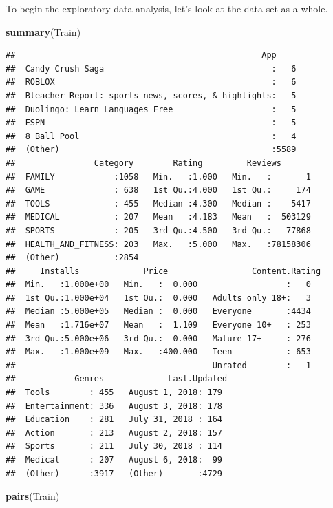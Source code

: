 \documentclass[]{article}
\newenvironment{Shaded}{\begin{snugshade}}{\end{snugshade}}
\newcommand{\KeywordTok}[1]{\textcolor[rgb]{0.13,0.29,0.53}{\textbf{#1}}}
\newcommand{\NormalTok}[1]{#1}
\begin{document}
To begin the exploratory data analysis, let's look at the data set as a
whole.

\begin{Shaded}
\begin{Highlighting}[]
\KeywordTok{summary}\NormalTok{(Train)}
\end{Highlighting}
\end{Shaded}

\begin{verbatim}
##                                                  App      
##  Candy Crush Saga                                  :   6  
##  ROBLOX                                            :   6  
##  Bleacher Report: sports news, scores, & highlights:   5  
##  Duolingo: Learn Languages Free                    :   5  
##  ESPN                                              :   5  
##  8 Ball Pool                                       :   4  
##  (Other)                                           :5589  
##                Category        Rating         Reviews        
##  FAMILY            :1058   Min.   :1.000   Min.   :       1  
##  GAME              : 638   1st Qu.:4.000   1st Qu.:     174  
##  TOOLS             : 455   Median :4.300   Median :    5417  
##  MEDICAL           : 207   Mean   :4.183   Mean   :  503129  
##  SPORTS            : 205   3rd Qu.:4.500   3rd Qu.:   77868  
##  HEALTH_AND_FITNESS: 203   Max.   :5.000   Max.   :78158306  
##  (Other)           :2854                                     
##     Installs             Price                 Content.Rating
##  Min.   :1.000e+00   Min.   :  0.000                  :   0  
##  1st Qu.:1.000e+04   1st Qu.:  0.000   Adults only 18+:   3  
##  Median :5.000e+05   Median :  0.000   Everyone       :4434  
##  Mean   :1.716e+07   Mean   :  1.109   Everyone 10+   : 253  
##  3rd Qu.:5.000e+06   3rd Qu.:  0.000   Mature 17+     : 276  
##  Max.   :1.000e+09   Max.   :400.000   Teen           : 653  
##                                        Unrated        :   1  
##            Genres             Last.Updated 
##  Tools        : 455   August 1, 2018: 179  
##  Entertainment: 336   August 3, 2018: 178  
##  Education    : 281   July 31, 2018 : 164  
##  Action       : 213   August 2, 2018: 157  
##  Sports       : 211   July 30, 2018 : 114  
##  Medical      : 207   August 6, 2018:  99  
##  (Other)      :3917   (Other)       :4729
\end{verbatim}

\begin{Shaded}
\begin{Highlighting}[]
\KeywordTok{pairs}\NormalTok{(Train)}
\end{Highlighting}
\end{Shaded}
\end{document}
